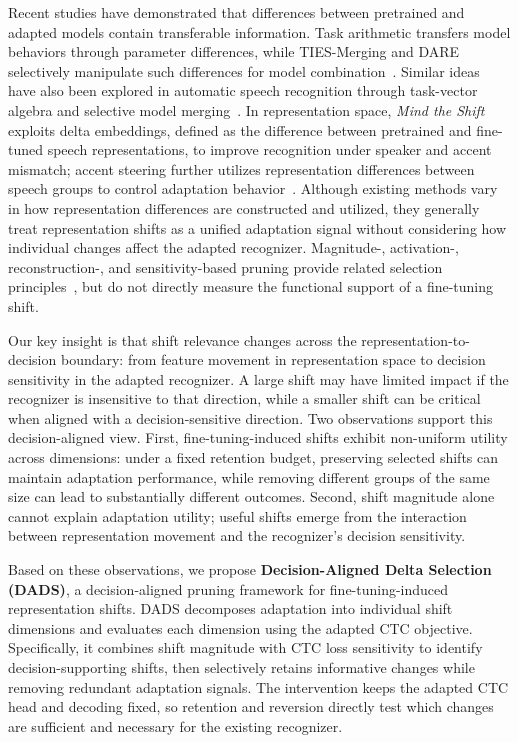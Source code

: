 \documentclass{article}
\begin{document}
Recent studies have demonstrated that differences between pretrained and adapted models contain transferable information. Task arithmetic transfers model behaviors through parameter differences, while TIES-Merging and DARE selectively manipulate such differences for model combination~\cite{ilharco2023task,yadav2023ties,yu2024dare}. Similar ideas have also been explored in automatic speech recognition through task-vector algebra and selective model merging~\cite{ramesh2024taskvector,shankar2025selective}. In representation space, \emph{Mind the Shift} exploits delta embeddings, defined as the difference between pretrained and fine-tuned speech representations, to improve recognition under speaker and accent mismatch; accent steering further utilizes representation differences between speech groups to control adaptation behavior~\cite{wang2026mind,sun2026activation}. Although existing methods vary in how representation differences are constructed and utilized, they generally treat representation shifts as a unified adaptation signal without considering how individual changes affect the adapted recognizer. Magnitude-, activation-, reconstruction-, and sensitivity-based pruning provide related selection principles~\cite{sun2024wanda,frantar2023sparsegpt,genova2025keep,molchanov2017pruning,sanh2020movement}, but do not directly measure the functional support of a fine-tuning shift.

Our key insight is that shift relevance changes across the representation-to-decision boundary: from feature movement in representation space to decision sensitivity in the adapted recognizer. A large shift may have limited impact if the recognizer is insensitive to that direction, while a smaller shift can be critical when aligned with a decision-sensitive direction. Two observations support this decision-aligned view. First, fine-tuning-induced shifts exhibit non-uniform utility across dimensions: under a fixed retention budget, preserving selected shifts can maintain adaptation performance, while removing different groups of the same size can lead to substantially different outcomes. Second, shift magnitude alone cannot explain adaptation utility; useful shifts emerge from the interaction between representation movement and the recognizer's decision sensitivity.

Based on these observations, we propose \textbf{Decision-Aligned Delta Selection (DADS)}, a decision-aligned pruning framework for fine-tuning-induced representation shifts. DADS decomposes adaptation into individual shift dimensions and evaluates each dimension using the adapted CTC objective. Specifically, it combines shift magnitude with CTC loss sensitivity to identify decision-supporting shifts, then selectively retains informative changes while removing redundant adaptation signals. The intervention keeps the adapted CTC head and decoding fixed, so retention and reversion directly test which changes are sufficient and necessary for the existing recognizer.
\end{document}
